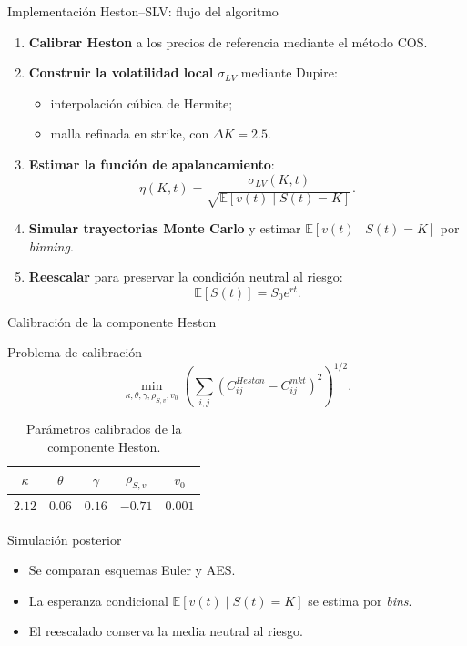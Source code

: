 \documentclass[8pt]{beamer}
\begin{document}
\begin{frame}{Implementación Heston--SLV: flujo del algoritmo}
\begin{enumerate}
    \item \textbf{Calibrar Heston} a los precios de referencia mediante el método COS.
    \pause
    \item \textbf{Construir la volatilidad local} $\sigma_{LV}$ mediante Dupire:
    \begin{itemize}
        \item interpolación cúbica de Hermite;
        \item malla refinada en strike, con $\Delta K=2.5$.
    \end{itemize}
    \pause
    \item \textbf{Estimar la función de apalancamiento}:
    \[
        \eta(K,t)=\frac{\sigma_{LV}(K,t)}{\sqrt{\mathbb E[v(t)\mid S(t)=K]}}.
    \]
    \pause
    \item \textbf{Simular trayectorias Monte Carlo} y estimar $\mathbb E[v(t)\mid S(t)=K]$ por \textit{binning}.
    \pause
    \item \textbf{Reescalar} para preservar la condición neutral al riesgo:
    \[
        \mathbb{E}[S(t)] = S_0e^{rt}.
    \]
\end{enumerate}
\end{frame}

\begin{frame}{Calibración de la componente Heston}
    \begin{block}{Problema de calibración}
    \[
        \min_{\kappa,\theta,\gamma,\rho_{S,v},v_0}
        \left(\sum_{i,j}\left(C_{ij}^{Heston} - C_{ij}^{mkt}\right)^2\right)^{1/2}.
    \]
    \end{block}
    \pause
    
    \begin{table}
    \centering
    \begin{tabular}{ccccc}
    \hline
    $\kappa$ & $\theta$ & $\gamma$ & $\rho_{S,v}$ & $v_0$ \\
    \hline
    $2.12$ & $0.06$ & $0.16$ & $-0.71$ & $0.001$ \\
    \hline
    \end{tabular}
    \caption{Parámetros calibrados de la componente Heston.}
    \end{table}
    \pause

    \begin{block}{Simulación posterior}
    \begin{itemize}
        \item Se comparan esquemas Euler y AES.
        \item La esperanza condicional $\mathbb E[v(t)\mid S(t)=K]$ se estima por \textit{bins}.
        \item El reescalado conserva la media neutral al riesgo.
    \end{itemize}
    \end{block}
\end{frame}
\end{document}
